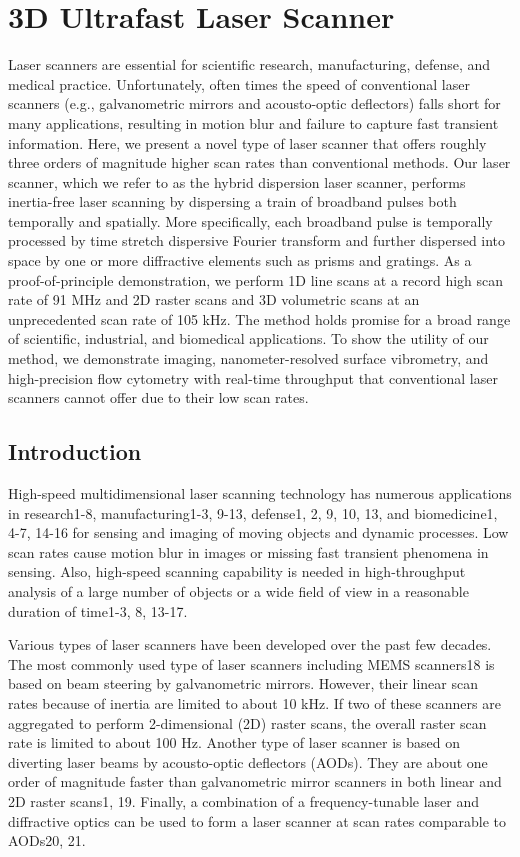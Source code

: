\chapter{3D Ultrafast Laser Scanner}

Laser scanners are essential for scientific research, manufacturing, defense, and medical practice. Unfortunately, often times the speed of conventional laser scanners (e.g., galvanometric mirrors and acousto-optic deflectors) falls short for many applications, resulting in motion blur and failure to capture fast transient information. Here, we present a novel type of laser scanner that offers roughly three orders of magnitude higher scan rates than conventional methods. Our laser scanner, which we refer to as the hybrid dispersion laser scanner, performs inertia-free laser scanning by dispersing a train of broadband pulses both temporally and spatially. More specifically, each broadband pulse is temporally processed by time stretch dispersive Fourier transform and further dispersed into space by one or more diffractive elements such as prisms and gratings. As a proof-of-principle demonstration, we perform 1D line scans at a record high scan rate of 91 MHz and 2D raster scans and 3D volumetric scans at an unprecedented scan rate of 105 kHz. The method holds promise for a broad range of scientific, industrial, and biomedical applications. To show the utility of our method, we demonstrate imaging, nanometer-resolved surface vibrometry, and high-precision flow cytometry with real-time throughput that conventional laser scanners cannot offer due to their low scan rates.

\section{Introduction}

High-speed multidimensional laser scanning technology has numerous applications in research1-8, manufacturing1-3, 9-13, defense1, 2, 9, 10, 13, and biomedicine1, 4-7, 14-16 for sensing and imaging of moving objects and dynamic processes. Low scan rates cause motion blur in images or missing fast transient phenomena in sensing. Also, high-speed scanning capability is needed in high-throughput analysis of a large number of objects or a wide field of view in a reasonable duration of time1-3, 8, 13-17.

Various types of laser scanners have been developed over the past few decades. The most commonly used type of laser scanners including MEMS scanners18 is based on beam steering by galvanometric mirrors. However, their linear scan rates because of inertia are limited to about 10 kHz. If two of these scanners are aggregated to perform 2-dimensional (2D) raster scans, the overall raster scan rate is limited to about 100 Hz. Another type of laser scanner is based on diverting laser beams by acousto-optic deflectors (AODs). They are about one order of magnitude faster than galvanometric mirror scanners in both linear and 2D raster scans1, 19. Finally, a combination of a frequency-tunable laser and diffractive optics can be used to form a laser scanner at scan rates comparable to AODs20, 21.

